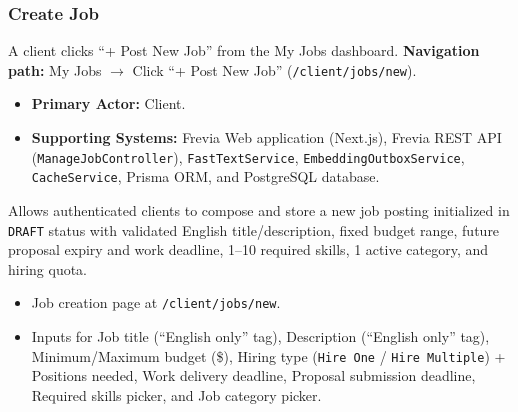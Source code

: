 \subsubsection{Create Job}

A client clicks ``+ Post New Job'' from the My Jobs dashboard.\newline
\textbf{Navigation path:} My Jobs $\rightarrow$ Click ``+ Post New Job'' (\texttt{/client/jobs/new}).


\begin{itemize}[leftmargin=1.6em,topsep=3pt,itemsep=2pt,parsep=0pt,label=$\bullet$]
    \item \textbf{Primary Actor:} Client.
    \item \textbf{Supporting Systems:} Frevia Web application (Next.js), Frevia REST API (\texttt{ManageJobController}), \texttt{FastTextService}, \texttt{EmbeddingOutboxService}, \texttt{CacheService}, Prisma ORM, and PostgreSQL database.
\end{itemize}

\noindent Allows authenticated clients to compose and store a new job posting initialized in \texttt{DRAFT} status with validated English title/description, fixed budget range, future proposal expiry and work deadline, 1--10 required skills, 1 active category, and hiring quota.

\begin{itemize}[leftmargin=1.6em,topsep=3pt,itemsep=2pt,parsep=0pt,label=$\bullet$]
    \item Job creation page at \texttt{/client/jobs/new}.
    \item Inputs for Job title (``English only'' tag), Description (``English only'' tag), Minimum/Maximum budget (\$), Hiring type (\texttt{Hire One} / \texttt{Hire Multiple}) + Positions needed, Work delivery deadline, Proposal submission deadline, Required skills picker, and Job category picker.
\end{itemize}


